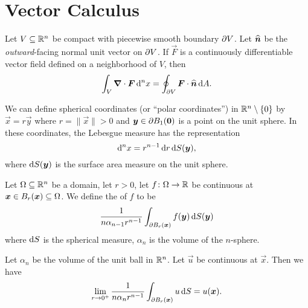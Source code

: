\chapter{Vector Calculus}


\begin{theorem}[Divergence]\label{vector-calc-0000}%
Let $V\subseteq\mathbb{R}^{n}$ be compact with piecewise smooth boundary $\partial V$.
Let $\widehat{\bm{n}}$ be the \emph{outward}-facing normal unit vector
on $\partial V$.
If $\vec{F}$ is a continuously differentiable vector field defined on a
neighborhood of $V$, then
\begin{equation*}
\int_{V}\bm{\nabla}\cdot\bm{F}\,\mathrm{d}^{n}x=\oint_{\partial V}\bm{F}\cdot\widehat{\bm{n}}\,\mathrm{d} A.
\end{equation*}
\end{theorem}

\begin{node}\label{vector-calc-0001}%
We can define spherical coordinates (or ``polar coordinates'') in
$\mathbb{R}^{n}\setminus\{0\}$ by $\vec{x}=r\vec{y}$ where $r=\|\vec{x}\|>0$
and $\bm{y}\in\partial B_{1}(\bm{0})$ is a point on the unit sphere. In
these coordinates, the Lebesgue measure has the representation
\begin{equation*}
\mathrm{d}^{n}x=r^{n-1}\,\mathrm{d} r\,\mathrm{d} S(\bm{y}),
\end{equation*}
where $\mathrm{d} S(\bm{y})$ is the surface area measure on the unit sphere.
\end{node}

\begin{definition}\label{vector-calc-0002}%
Let $\Omega\subseteq\mathbb{R}^{n}$ be a domain, let $r>0$, let $f\colon\Omega\to\mathbb{R}$ be
continuous at $\bm{x}\in B_{r}(\bm{x})\subseteq\Omega$. We define the
 of $f$ to be
\begin{equation*}
\frac{1}{n\alpha_{n-1}r^{n-1}}\int_{\partial B_{r}(\bm{x})}f(\bm{y})\,\mathrm{d} S(\bm{y})
\end{equation*}
where $\mathrm{d} S$ is the spherical measure, $\alpha_{n}$ is the volume of the
$n$-sphere. 
\end{definition}

\begin{theorem}\label{vector-calc-0003}%
Let $\alpha_{n}$ be the volume of the unit ball in $\mathbb{R}^{n}$. Let
$\vec{u}$ be continuous at $\vec{x}$. Then we have
\begin{equation*}
\lim_{r\to0^{+}}\frac{1}{n\alpha_{n}r^{n-1}}\int_{\partial B_{r}(\bm{x})}u\,\mathrm{d} S=u(\bm{x}).
\end{equation*}
\end{theorem}

